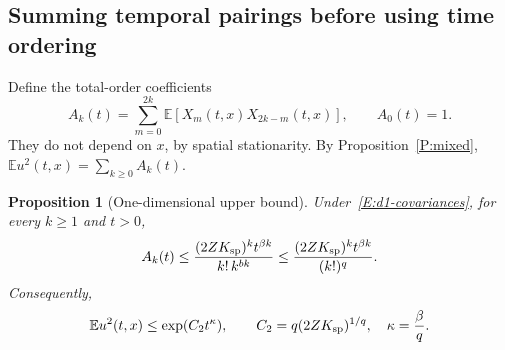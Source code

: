 \documentclass[12pt]{article}
\numberwithin{equation}{section}
\newtheorem{proposition}[theorem]{Proposition}
\theoremstyle{definition}
\newcommand{\E}{\mathbb{E}}
\begin{document}
\subsection{Summing temporal pairings before using time ordering}

Define the total-order coefficients
\[
  A_k(t)=\sum_{m=0}^{2k}\E[X_m(t,x)X_{2k-m}(t,x)],\qquad A_0(t)=1.
\]
They do not depend on $x$, by spatial stationarity. By
Proposition~\ref{P:mixed}, $\E u^2(t,x)=\sum_{k\ge0}A_k(t)$.

\begin{proposition}[One-dimensional upper bound]\label{P:d1-upper}
  Under~\eqref{E:d1-covariances}, for every $k\ge1$ and $t>0$,
  \begin{equation}\label{E:d1-coefficient}
    A_k(t)\le
    \frac{(2ZK_{\rm sp})^k t^{\beta k}}{k!\,k^{bk}}
    \le\frac{(2ZK_{\rm sp})^k t^{\beta k}}{(k!)^q}.
  \end{equation}
  Consequently,
  \begin{equation}\label{E:d1-upper}
    \E u^2(t,x)\le\exp(C_2t^\kappa),\qquad
    C_2=q(2ZK_{\rm sp})^{1/q},\quad \kappa=\frac{\beta}{q}.
  \end{equation}
\end{proposition}
\end{document}
